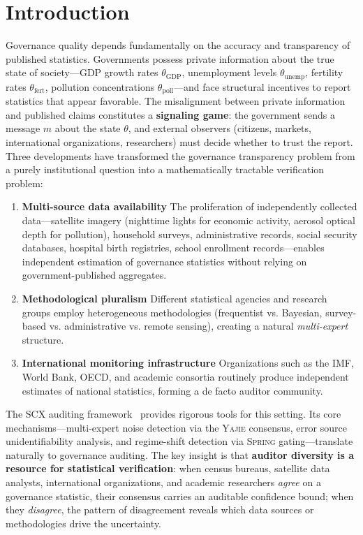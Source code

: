 \documentclass[11pt,a4paper]{article}
\theoremstyle{definition}
\newcommand{\Yajie}{\textsc{Yajie}}
\newcommand{\Spring}{\textsc{Spring}}
\newcommand{\SCX}{\textsc{SCX}}
\begin{document}
\section{Introduction}
Governance quality depends fundamentally on the accuracy and transparency of published statistics. Governments possess private information about the true state of society---GDP growth rates $\theta_{\mathrm{GDP}}$, unemployment levels $\theta_{\mathrm{unemp}}$, fertility rates $\theta_{\mathrm{fert}}$, pollution concentrations $\theta_{\mathrm{poll}}$---and face structural incentives to report statistics that appear favorable. The misalignment between private information and published claims constitutes a \textbf{signaling game}: the government sends a message $m$ about the state $\theta$, and external observers (citizens, markets, international organizations, researchers) must decide whether to trust the report.
Three developments have transformed the governance transparency problem from a purely institutional question into a mathematically tractable verification problem:
\begin{enumerate}[label=(\roman*)]
    \item \textbf{Multi-source data availability} The proliferation of independently collected data---satellite imagery (nighttime lights for economic activity, aerosol optical depth for pollution), household surveys, administrative records, social security databases, hospital birth registries, school enrollment records---enables independent estimation of governance statistics without relying on government-published aggregates.
    \item \textbf{Methodological pluralism} Different statistical agencies and research groups employ heterogeneous methodologies (frequentist vs. Bayesian, survey-based vs. administrative vs. remote sensing), creating a natural \textit{multi-expert} structure.
    \item \textbf{International monitoring infrastructure} Organizations such as the IMF, World Bank, OECD, and academic consortia routinely produce independent estimates of national statistics, forming a de facto auditor community.
\end{enumerate}
The \SCX{} auditing framework~\cite{SCX2025} provides rigorous tools for this setting. Its core mechanisms---multi-expert noise detection via the \Yajie{} consensus, error source unidentifiability analysis, and regime-shift detection via \Spring{} gating---translate naturally to governance auditing. The key insight is that \textbf{auditor diversity is a resource for statistical verification}: when census bureaus, satellite data analysts, international organizations, and academic researchers \textit{agree} on a governance statistic, their consensus carries an auditable confidence bound; when they \textit{disagree}, the pattern of disagreement reveals which data sources or methodologies drive the uncertainty.
\end{document}
